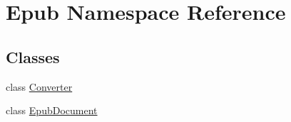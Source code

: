 \hypertarget{namespaceEpub}{\section{Epub Namespace Reference}
\label{namespaceEpub}
}
\subsection*{Classes}
\begin{DoxyCompactItemize}
\item 
class \hyperlink{classEpub_1_1Converter}{Converter}
\item 
class \hyperlink{classEpub_1_1EpubDocument}{Epub\+Document}
\end{DoxyCompactItemize}
